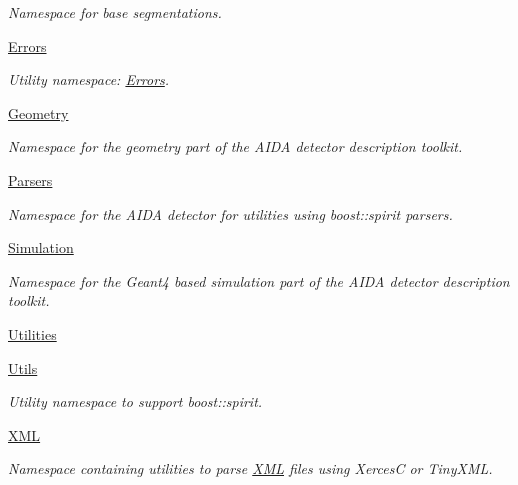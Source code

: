 \begin{DoxyCompactItemize}
\begin{DoxyCompactList}\small\item\em Namespace for base segmentations. \end{DoxyCompactList}\item 
 \hyperlink{namespace_d_d4hep_1_1_errors}{Errors}
\begin{DoxyCompactList}\small\item\em Utility namespace\+: \hyperlink{namespace_d_d4hep_1_1_errors}{Errors}. \end{DoxyCompactList}\item 
 \hyperlink{namespace_d_d4hep_1_1_geometry}{Geometry}
\begin{DoxyCompactList}\small\item\em Namespace for the geometry part of the A\+I\+DA detector description toolkit. \end{DoxyCompactList}\item 
 \hyperlink{namespace_d_d4hep_1_1_parsers}{Parsers}
\begin{DoxyCompactList}\small\item\em Namespace for the A\+I\+DA detector for utilities using boost\+::spirit parsers. \end{DoxyCompactList}\item 
 \hyperlink{namespace_d_d4hep_1_1_simulation}{Simulation}
\begin{DoxyCompactList}\small\item\em Namespace for the Geant4 based simulation part of the A\+I\+DA detector description toolkit. \end{DoxyCompactList}\item 
 \hyperlink{namespace_d_d4hep_1_1_utilities}{Utilities}
\item 
 \hyperlink{namespace_d_d4hep_1_1_utils}{Utils}
\begin{DoxyCompactList}\small\item\em Utility namespace to support boost\+::spirit. \end{DoxyCompactList}\item 
 \hyperlink{namespace_d_d4hep_1_1_x_m_l}{X\+ML}
\begin{DoxyCompactList}\small\item\em Namespace containing utilities to parse \hyperlink{namespace_d_d4hep_1_1_x_m_l}{X\+ML} files using XercesC or Tiny\+X\+ML. \end{DoxyCompactList}\end{DoxyCompactItemize}

